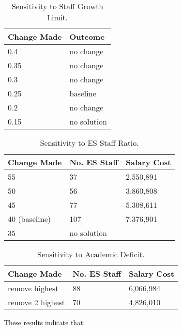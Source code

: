 \documentclass[11pt, a4paper]{article}
\begin{document}
    \begin{table}[!ht]
        \centering
        \caption{Sensitivity to Staff Growth Limit.}
        \begin{tabular}{|l|l|}
        \hline
            Change Made & Outcome \\ \hline
            0.4 & no change \\ \hline
            0.35 & no change \\ \hline
            0.3 & no change \\ \hline
            0.25 & baseline \\ \hline
            0.2 & no change \\ \hline
            0.15 & no solution \\ \hline
        \end{tabular}
        \label{sens1}
    \end{table}

    \begin{table}[!ht]
        \centering
        \caption{Sensitivity to ES Staff Ratio.}
        \begin{tabular}{|l|l|l|}
        \hline
            Change Made & No. ES Staff & Salary Cost \\ \hline
            55 & 37 & 2,550,891 \\ \hline
            50 & 56 & 3,860,808 \\ \hline
            45 & 77 & 5,308,611 \\ \hline 
            40 (baseline) & 107 & 7,376,901 \\ \hline
            35 & no solution & ~ \\ \hline
        \end{tabular}
        \label{sens2}
    \end{table}

    \begin{table}[!ht]
        \centering
        \caption{Sensitivity to Academic Deficit.}
        \begin{tabular}{|l|l|l|}
        \hline
            Change Made & No. ES Staff & Salary Cost \\ \hline
            remove highest & 88 & 6,066,984 \\ \hline
            remove 2 highest & 70 & 4,826,010 \\ \hline
        \end{tabular}
        \label{sens3}
    \end{table}

    These results indicate that:
\end{document}
